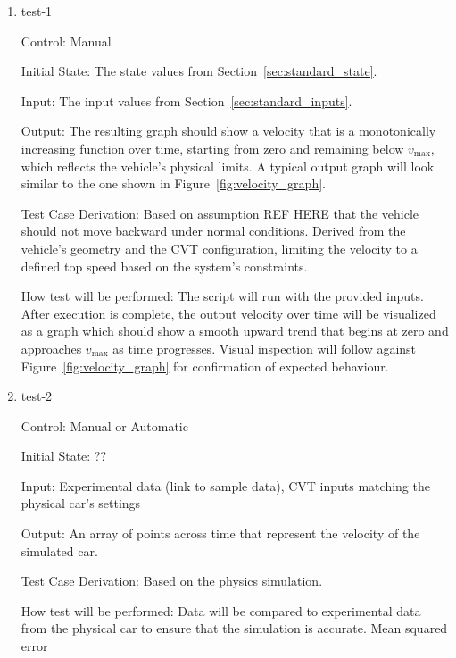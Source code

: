 \documentclass[12pt, titlepage]{article}
\begin{document}
\begin{enumerate}

\item{test-1\\}

Control: Manual
					
Initial State: The state values from Section~\ref{sec:standard_state}.

Input: The input values from Section~\ref{sec:standard_inputs}.
					
Output: The resulting graph should show a velocity that is a monotonically increasing function over time, starting from zero and remaining below $v_\text{max}$, which reflects the vehicle’s physical limits. A typical output graph will look similar to the one shown in Figure~\ref{fig:velocity_graph}.


Test Case Derivation: Based on assumption REF HERE that the vehicle should not move backward under normal conditions.
Derived from the vehicle’s geometry and the CVT configuration, limiting the velocity to a defined top speed based on the system’s constraints.


How test will be performed: The script will run with the provided inputs. After execution is complete, the output velocity over time will be visualized as a graph which should show a smooth upward trend that begins at zero and approaches $v_\text{max}$ as time progresses. Visual inspection will follow against Figure~\ref{fig:velocity_graph} for confirmation of expected behaviour.
					
\item{test-2\\}

Control: Manual or Automatic

Initial State: ??

Input: Experimental data (link to sample data), CVT inputs matching the physical car's settings

Output: An array of points across time that represent the velocity of the simulated car.

Test Case Derivation: Based on the physics simulation.

How test will be performed: Data will be compared to experimental data from the physical car to ensure that the simulation is accurate. Mean squared error

\end{enumerate}
\end{document}

